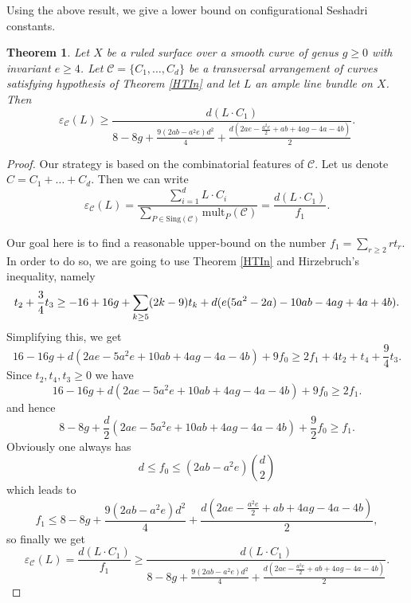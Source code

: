 \documentclass[12pt,reqno]{amsart}
\theoremstyle{plain}
\numberwithin{equation}{section}
\newtheorem{theorem}{Theorem}[section]
\theoremstyle{definition}
\begin{document}
	
	Using the above result, we give a lower bound on configurational Seshadri constants.	
	\begin{theorem} Let $X$ be a ruled surface over a smooth curve of genus $g \geq 0$ with invariant $e
		\ge 4$.  
		Let
$\mathcal{C} = \{C_{1}, \ldots, C_{d}\}$		
		 be a transversal arrangement of curves satisfying hypothesis of Theorem \ref{HTIn} and let $L$ an ample line bundle on $X$. Then 
		$$\varepsilon_{\mathcal{C}}(
		L) \geq \frac{d(L\cdot C_1)}{8-8g+\frac{9(2ab-a^2e)d^2}{4}+\frac{d(2ae-\frac{a^2e}{2}+ab+4ag-4a-4b)}{2}}.$$
	\end{theorem}
	\begin{proof}
		Our strategy is based on the combinatorial features of $\mathcal{C}$. Let us denote $C = C_{1} + \ldots + C_{d}$. Then we can write 
		\begin{equation}
			\varepsilon_\mathcal{C}(L)= \frac{\sum_{i=1}^{d}L\cdot C_i}{\sum_{P \in \text{Sing}(\mathcal{C}) }\text{mult}_P(\mathcal{C})}=\frac{d(L\cdot C_1)}{f_1}.
		\end{equation}	
		
		Our goal here is to find a reasonable upper-bound on the number $f_{1} = \sum_{r\geq 2} rt_{r}$. In order to do so, we are going to use Theorem \ref{HTIn} and Hirzebruch's inequality, namely
		\begin{equation*}\label{eq:Hirzebruch type ineq}
			t_{2}+\frac{3}{4}t_{3} \geq -16+16g+\sum_{k\geq5}(2k-9)t_{k}+
			d(e(5a^2-2a)-10ab-4ag+4a+4b).\\
		\end{equation*}	
		Simplifying this, we get
		\begin{equation*}\label{eq:4.7}
			16-16g+d(2ae-5a^2e+10ab+4ag-4a-4b)+9f_0 \geq2f_1+4t_2 +t_{4} + \frac{9}{4}t_{3}.
		\end{equation*}
		Since $t_{2}, t_{4},t_{3} \geq 0$ we have
		\begin{equation*}\label{eq:4.7}
			16-16g+d(2ae-5a^2e+10ab+4ag-4a-4b)+9f_0 \geq2f_1.
		\end{equation*}
		and hence
		\begin{equation*}\label{eq:4.7}
			8-8g+\frac{d}{2}(2ae-5a^2e+10ab+4ag-4a-4b)+\frac{9}{2}f_0 \geq f_1.
		\end{equation*}
		Obviously one always has $$d \leq f_{0} \leq (2ab-a^2e) {d \choose 2}$$ which leads to
		\begin{equation*}
			f_1 \leq 8-8g+\frac{9(2ab-a^2e)d^2}{4}+\frac{d(2ae-\frac{a^2e}{2}+ab+4ag-4a-4b)}{2},
		\end{equation*}
		so finally we get
		\begin{equation*}
			\varepsilon_\mathcal{C}(L)=\frac{d(L\cdot C_1)}{f_1} \geq \frac{d(L\cdot C_1)}{8-8g+\frac{9(2ab-a^2e)d^2}{4}+\frac{d(2ae-\frac{a^2e}{2}+ab+4ag-4a-4b)}{2}}.
		\end{equation*}		
	\end{proof}
	
\end{document}
